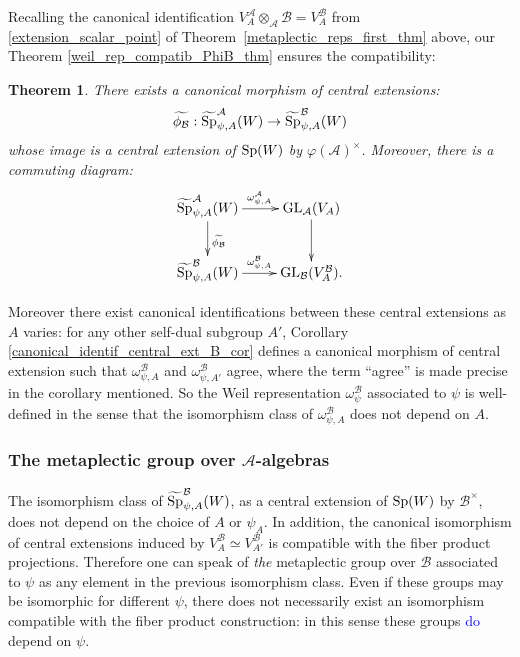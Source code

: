 \documentclass[11pt]{article}
\theoremstyle{plain}
\theoremstyle{definition}
\theoremstyle{plain}
\theoremstyle{definition}
\theoremstyle{plain}
\newtheorem{theorem}{Theorem}
\def\shaun#1{\textcolor{blue}{#1}}
\begin{document}
Recalling the canonical identification $V_A^\mathcal{A} \otimes_\mathcal{A} \mathcal{B} = V_A^\mathcal{B}$ from \ref{extension_scalar_point} of Theorem~\ref{metaplectic_reps_first_thm} above, our Theorem \ref{weil_rep_compatib_PhiB_thm} ensures the compatibility:

\begin{theorem} \label{weil_rep_comptib_PhiB_thm_intro} There exists a canonical morphism of central extensions:
$$\widetilde{\phi_\mathcal{B}} : \widetilde{\textup{Sp}}_{\psi,A}^\mathcal{A}(W) \to \widetilde{\textup{Sp}}_{\psi,A}^\mathcal{B}(W)$$
whose image is a central extension of $\textup{Sp}(W)$ by $\varphi(\mathcal{A})^\times$. Moreover, there is a commuting diagram:
$$\xymatrix{
		\widetilde{\textup{Sp}}_{\psi,A}^\mathcal{A}(W) \ar[r]^{\omega_{\psi,A}^\mathcal{A}} \ar[d]^{\widetilde{\phi_\mathcal{B}}} & \textup{GL}_\mathcal{A}(V_A)  \ar[d] \\
		\widetilde{\textup{Sp}}_{\psi,A}^\mathcal{B}(W) \ar[r]^{\omega_{\psi,A}^\mathcal{B}} & \textup{GL}_\mathcal{B}(V_A^\mathcal{B}).
		}$$ \end{theorem}

Moreover there exist canonical identifications between these central extensions as $A$ varies: for any other self-dual subgroup $A'$, Corollary \ref{canonical_identif_central_ext_B_cor} defines a canonical morphism of central extension such that $\omega_{\psi,A}^\mathcal{B}$ and $\omega_{\psi,A'}^\mathcal{B}$ agree, where the term ``agree'' is made precise in the corollary mentioned. So the Weil representation $\omega_\psi^\mathcal{B}$ associated to $\psi$ is well-defined in the sense that the isomorphism class of $\omega_{\psi,A}^\mathcal{B}$ does not depend on $A$.

\subsubsection*{The metaplectic group over $\mathcal{A}$-algebras}

The isomorphism class of $\widetilde{\textup{Sp}}_{\psi,A}^\mathcal{B}(W)$, as a central extension of $\textup{Sp}(W)$ by $\mathcal{B}^\times$, does not depend on the choice of $A$ or $\psi_A$. In addition, the canonical isomorphism of central extensions induced by $V_A^\mathcal{B} \simeq V_{A'}^\mathcal{B}$ is compatible with the fiber product projections. Therefore one can speak of \textit{the} metaplectic group over $\mathcal{B}$ associated to $\psi$ as any element in the previous isomorphism class. Even if these groups may be isomorphic for different $\psi$, there does not necessarily exist an isomorphism compatible with the fiber product construction: in this sense these groups 
\shaun{do} %
depend on $\psi$.
\end{document}
